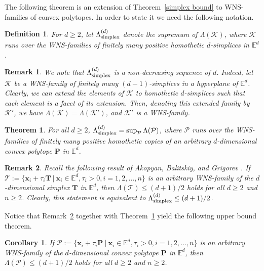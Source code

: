 \documentclass[12pt]{article}
\newtheorem{cor}{Corollary}
\newtheorem{thm}{Theorem}
\newtheorem{defn}{Definition}
\newtheorem{rem}{Remark}
\newcommand{\xx}{\mathbf{x}}
\newcommand{\K}{\mathcal{K}}
\newcommand{\Ee}{{\mathbb E}}
\begin{document}
The following theorem is an extension of Theorem~\ref{simplex bound} to WNS-families of convex polytopes. In order to state it we need the following notation.

\begin{defn}\label{WNS-simplex}
For $d \geq 2$, let $\Lambda_{\rm simplex}^{(d)}$ denote the supremum of $\Lambda(\K)$, where $\K$ runs over the WNS-families of finitely many positive homothetic $d$-simplices in $\Ee^d$. 
\end{defn}

\begin{rem}
We note that $\Lambda_{\rm simplex}^{(d)}$ is a non-decreasing sequence of $d$. Indeed, let $\K$ be a WNS-family of finitely many $(d-1)$-simplices in a hyperplane of $\Ee^d$. Clearly, we can extend the elements of $\K$ to homothetic $d$-simplices such that each element is a facet of its extension. Then, denoting this extended family by ${\K}'$, we have $\Lambda (\K) = \Lambda({\K}')$, and ${\K}'$ is a WNS-family.
\end{rem}

\begin{thm}\label{WNS-simplex bound}
For all $d\ge 2$, $\Lambda_{\rm simplex}^{(d)}=\sup_{\mathcal{P}} \Lambda(\mathcal{P})$, where $\mathcal{P}$ runs over the WNS-families of finitely many positive homothetic copies of an arbitrary $d$-dimensional convex polytope $\mathbf{P}$ in $\Ee^d$.
\end{thm}

\begin{rem} \label{upper bound for simplices} Recall the following result of Akopyan, Balitskiy, and Grigorev \cite{ABG}. If $\mathcal{T} := \{ \xx_i + \tau_i \mathbf{T}\ |\  \xx_i\in \Ee^d, \tau_i>0, i=1,2,\ldots, n\}$ is an arbitrary WNS-family of the $d$-dimensional simplex $\mathbf{T}$ in $\Ee^d$, then $\Lambda(\mathcal{T})\leq (d+1)/2$ holds for all $d\geq 2$ and $n\geq 2$. Clearly,  this statement is equivalent to $\Lambda_{\rm simplex}^{(d)}\leq (d+1)/2$. 
\end{rem}

Notice that Remark~\ref{upper bound for simplices} together with Theorem~\ref{WNS-simplex bound} yield the following upper bound theorem. 

\begin{cor} \label {upper bound theorem} If $\mathcal{P} := \{ \xx_i + \tau_i \mathbf{P}\ |\  \xx_i\in \Ee^d, \tau_i>0, i=1,2,\ldots, n\}$ is an arbitrary WNS-family of the $d$-dimensional convex polytope $\mathbf{P}$ in $\Ee^d$, then $\Lambda(\mathcal{P})\leq (d+1)/2$ holds for all $d\geq 2 $ and $n\geq 2$.
\end{cor}
\end{document}
